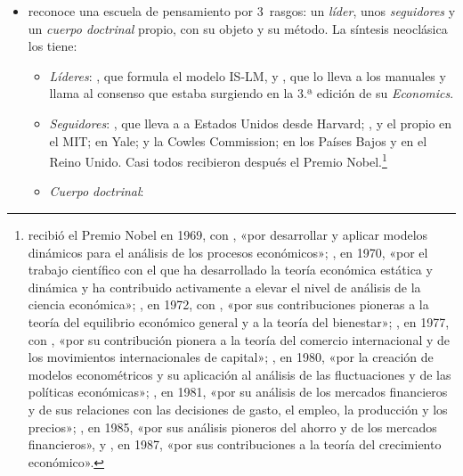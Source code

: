 \documentclass[11pt]{article}
\begin{document}
\begin{itemize}
\item {} reconoce una escuela de pensamiento por 3~rasgos: un \emph{líder}, unos \emph{seguidores} y un \emph{cuerpo doctrinal} propio, con su objeto y su método. La síntesis neoclásica los tiene:
  \begin{itemize}
  \item \emph{Líderes}: , que formula el modelo IS-LM\nocite{Hicks1937Keynes}, y , que lo lleva a los manuales y llama  al consenso que estaba surgiendo en la 3.ª edición de su \emph{Economics}\nocite{Samuelson1955Economics}.
  \item \emph{Seguidores}: , que lleva a  a Estados Unidos desde Harvard; ,  y el propio  en el MIT;  en Yale;  y la Cowles Commission;  en los Países Bajos y  en el Reino Unido. Casi todos recibieron después el Premio Nobel.\footnote{ recibió el Premio Nobel en 1969, con , «por desarrollar y aplicar modelos dinámicos para el análisis de los procesos económicos»\nocite{Nobel1969}; , en 1970, «por el trabajo científico con el que ha desarrollado la teoría económica estática y dinámica y ha contribuido activamente a elevar el nivel de análisis de la ciencia económica»\nocite{Nobel1970Samuelson}; , en 1972, con , «por sus contribuciones pioneras a la teoría del equilibrio económico general y a la teoría del bienestar»\nocite{Nobel1972HicksArrow}; , en 1977, con , «por su contribución pionera a la teoría del comercio internacional y de los movimientos internacionales de capital»\nocite{Nobel1977MeadeOhlin}; , en 1980, «por la creación de modelos econométricos y su aplicación al análisis de las fluctuaciones y de las políticas económicas»\nocite{Nobel1980Klein}; , en 1981, «por su análisis de los mercados financieros y de sus relaciones con las decisiones de gasto, el empleo, la producción y los precios»\nocite{Nobel1981Tobin}; , en 1985, «por sus análisis pioneros del ahorro y de los mercados financieros»\nocite{Nobel1985Modigliani}, y , en 1987, «por sus contribuciones a la teoría del crecimiento económico»\nocite{Nobel1987Solow}.}
  \item \emph{Cuerpo doctrinal}:

\end{itemize}
\end{itemize}
\end{document}
